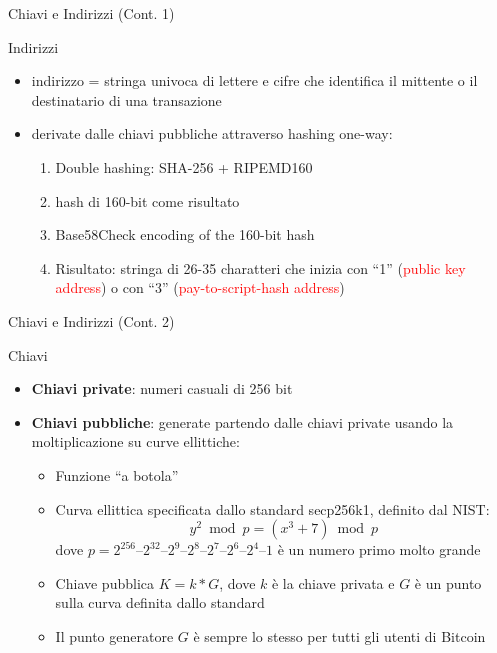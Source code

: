 \documentclass{beamer}
\newcommand\red[1]{\textcolor{red}{#1}}
\begin{document}
  \begin{frame}{Chiavi e Indirizzi (Cont. 1)}
    \begin{block}{Indirizzi}
      \begin{itemize}
        \item indirizzo = stringa univoca di lettere e cifre che identifica il mittente o il destinatario di una transazione  \pause
        \item derivate dalle chiavi pubbliche attraverso hashing one-way:
        \begin{enumerate}
          \item Double hashing: SHA-256 + RIPEMD160
          \item hash di 160-bit come risultato
          \item Base58Check encoding of the 160-bit hash
          \item Risultato: stringa di 26-35 charatteri che inizia con ``1'' (\red{public key address}) o con ``3'' (\red{pay-to-script-hash address})
        \end{enumerate}
      \end{itemize}
    \end{block}
  \end{frame}





  \begin{frame}{Chiavi e Indirizzi (Cont. 2)}
    \begin{block}{Chiavi}
      \begin{itemize}
        \item \textbf{Chiavi private}: numeri casuali di 256 bit \pause
        \item \textbf{Chiavi pubbliche}: generate partendo dalle chiavi private usando la moltiplicazione su curve ellittiche: \pause
        \begin{itemize}
          \item Funzione ``a botola'' 
          \item Curva ellittica specificata dallo standard secp256k1, definito dal NIST:
          \[ y^2 \bmod p = (x^3 + 7) \bmod p \]
          dove $p = 2^{256} – 2^{32} – 2^9 – 2^8 – 2^7 – 2^6 – 2^4 – 1$ è un numero primo molto grande 
          \item Chiave pubblica $K=k*G$, dove $k$ è la chiave privata e $G$ è un punto sulla curva definita dallo standard 
          \item Il punto generatore $G$ è sempre lo stesso per tutti gli utenti di Bitcoin
        \end{itemize}
      \end{itemize}
    \end{block}
  \end{frame}
\end{document}
